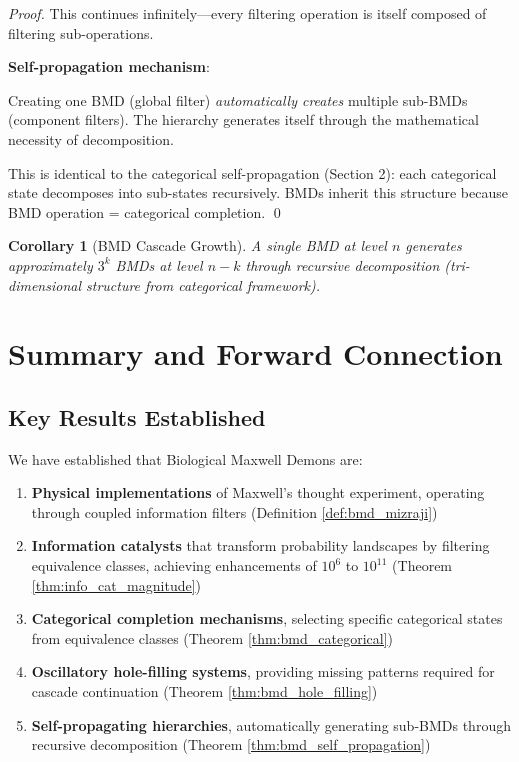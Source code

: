 \documentclass[11pt]{article}
\newtheorem{corollary}[theorem]{Corollary}
\theoremstyle{remark}
\begin{document}
\begin{proof}
This continues infinitely—every filtering operation is itself composed of filtering sub-operations.

\textbf{Self-propagation mechanism}:

Creating one BMD (global filter) \textit{automatically creates} multiple sub-BMDs (component filters). The hierarchy generates itself through the mathematical necessity of decomposition.

This is identical to the categorical self-propagation (Section 2): each categorical state decomposes into sub-states recursively. BMDs inherit this structure because BMD operation = categorical completion. \qed
\end{proof}

\begin{corollary}[BMD Cascade Growth]
\label{cor:bmd_cascade_growth}
A single BMD at level $n$ generates approximately $3^k$ BMDs at level $n-k$ through recursive decomposition (tri-dimensional structure from categorical framework).
\end{corollary}

\section{Summary and Forward Connection}

\subsection{Key Results Established}

We have established that Biological Maxwell Demons are:

\begin{enumerate}
\item \textbf{Physical implementations} of Maxwell's thought experiment, operating through coupled information filters (Definition \ref{def:bmd_mizraji})

\item \textbf{Information catalysts} that transform probability landscapes by filtering equivalence classes, achieving enhancements of $10^6$ to $10^{11}$ (Theorem \ref{thm:info_cat_magnitude})

\item \textbf{Categorical completion mechanisms}, selecting specific categorical states from equivalence classes (Theorem \ref{thm:bmd_categorical})

\item \textbf{Oscillatory hole-filling systems}, providing missing patterns required for cascade continuation (Theorem \ref{thm:bmd_hole_filling})

\item \textbf{Self-propagating hierarchies}, automatically generating sub-BMDs through recursive decomposition (Theorem \ref{thm:bmd_self_propagation})
\end{enumerate}
\end{document}
